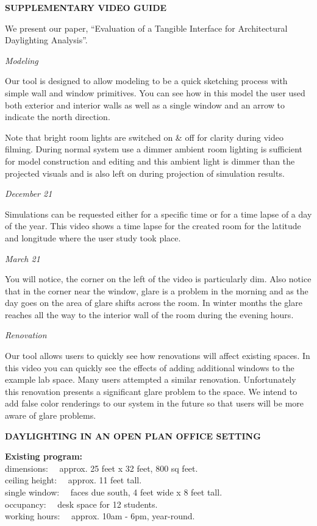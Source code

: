 \documentclass[12pt]{article}
\begin{document}
{\bf SUPPLEMENTARY VIDEO GUIDE  }

We present our paper, “Evaluation of a Tangible Interface for Architectural Daylighting Analysis”.  

{\em Modeling}

Our tool is designed to allow modeling to be a quick sketching process with simple wall and window primitives.  You can see how in this model the user used both exterior and interior walls as well as a single window and an arrow to indicate the north direction.  

Note that bright room lights are switched on \& off for clarity during video filming.  During normal system use a dimmer ambient room lighting is sufficient for model construction and editing and this ambient light is dimmer than the projected visuals and is also left on during projection of simulation results.

{\em December 21}

Simulations can be requested either for a specific time or for a time lapse of  a day of the year.  This video shows a time lapse for the created room for the latitude and longitude where the user study took place.

{\em March 21 }

You will notice, the corner on the left of the video is particularly dim.  Also notice that in the corner near the window, glare is a problem in the morning and as the day goes on the area of glare shifts across the room.  In winter months the glare reaches all the way to the interior wall of the room during the evening hours.

{\em Renovation}

Our tool allows users to quickly see how renovations will affect existing spaces.  In this video you can quickly see the effects of adding additional windows to the example lab space.  Many users attempted a similar renovation.  Unfortunately this renovation presents a significant  glare problem to the space.  We intend to add false color renderings to our system in the future so that users will be more aware of glare problems.

\newpage

{\bf DAYLIGHTING IN AN OPEN PLAN OFFICE SETTING }

\vspace{0.3in}

{\bf Existing program:}\vspace{0.1in}\\
\hspace*{0.2in}dimensions: ~~approx. 25 feet x 32 feet,  800 sq feet. \\
\hspace*{0.2in}ceiling height: ~~approx. 11 feet tall.\\
\hspace*{0.2in}single window: ~~faces due south, 4 feet wide x 8 feet tall.\\
\hspace*{0.2in}occupancy: ~~desk space for 12 students.\\
\hspace*{0.2in}working hours: ~~approx. 10am - 6pm,  year-round.
\end{document}
